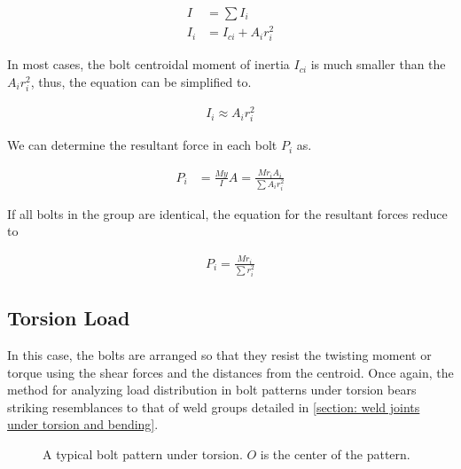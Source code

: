 \documentclass[
10pt,
a4paper,
openany,
svgnames,
]{book}
\begin{document}
\begin{align}
  \label{eq: moment of inertia of bolts}
  I &= \sum I_i \\
  I_i &= I_{ci} + A_ir_i^2 %
\end{align}

In most cases, the bolt centroidal moment of inertia $I_{ci}$ is much smaller than the $A_ir_i^2$, thus, the equation can be simplified to.

\begin{align}
  I_i \approx A_ir_i^2
\end{align}

We can determine the resultant force in each bolt $P_i$ as.

\begin{align}
  P_i &= \frac{My}{I}A = \frac{Mr_iA_i}{\sum A_ir_i^2} 
\end{align}

If all bolts in the group are identical, the equation for the resultant forces reduce to

\begin{align}
  \label{eq: reduced bolts under bending}
  P_i = \frac{Mr_i}{\sum r_i^2}
\end{align}

\subsection{Torsion Load}

In this case, the bolts are arranged so that they resist the twisting moment or torque using the shear forces and the distances from the centroid. Once again, the method for analyzing load distribution in bolt patterns under torsion bears striking resemblances to that of weld groups detailed in \cref{section: weld joints under torsion and bending}.

\begin{figure}[H]
  \centering
  \caption[Bolted Joint under Torsion]{A typical bolt pattern under torsion. $O$ is the center of the pattern.}
  \label{fig: bolts under torsion}
\end{figure}
\end{document}
